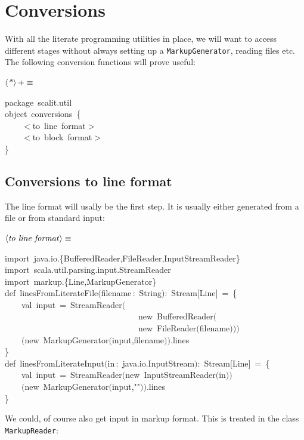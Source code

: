 \documentclass[a4paper,12pt]{article}
\begin{document}
\classindex
\section{Conversions}
With all the literate programming utilities in place, we will want to access
different stages without always setting up a \texttt{MarkupGenerator}, reading
files etc. The following conversion functions will prove useful:

$\left<\mbox{\emph{*}}\right>+\equiv$
\begin{program}{\vem package}~scalit.util
\\[0.5em]{\vem object}~conversions~{\small\{}
\\~~~~$<$to~line~format$>$
\\[0.5em]~~~~$<$to~block~format$>$
\\{\small\}}
\\[0.5em]\end{program}
\subsection{Conversions to line format}
The line format will usally be the first step. It is usually either generated
from a file or from standard input:

$\left<\mbox{\emph{to line format}}\right>\equiv$
\begin{program}{\vem import}~java.io.{\small\{}BufferedReader,FileReader,InputStreamReader{\small\}}
\\{\vem import}~scala.util.parsing.input.StreamReader
\\[0.5em]{\vem import}~markup.{\small\{}Line,MarkupGenerator{\small\}}
\\[0.5em]{\vem def}~linesFromLiterateFile$($filename\,{\rm :}~String$)${\rm :}~Stream$[$Line$]$~=~{\small\{}
\\~~~~{\vem val}~input~=~StreamReader$($
\\~~~~~~~~~~~~~~~~~~~~~~~~~~~~~~~~{\vem new}~BufferedReader$($
\\~~~~~~~~~~~~~~~~~~~~~~~~~~~~~~~~{\vem new}~FileReader$($filename$)$$)$$)$
\\~~~~$(${\vem new}~MarkupGenerator$($input,filename$)$$)$.lines
\\{\small\}}
\\[0.5em]{\vem def}~linesFromLiterateInput$($in\,{\rm :}~java.io.InputStream$)${\rm :}~Stream$[$Line$]$~=~{\small\{}
\\~~~~{\vem val}~input~=~StreamReader$(${\vem new}~InputStreamReader$($in$)$$)$
\\~~~~$(${\vem new}~MarkupGenerator$($input,""$)$$)$.lines
\\{\small\}}
\\[0.5em]\end{program}
We could, of course also get input in markup format. This is treated in
the class \texttt{MarkupReader}:
\end{document}
